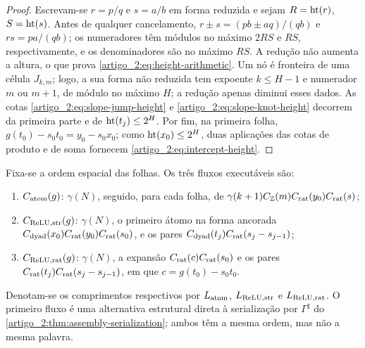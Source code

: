 \begin{proof}
Escrevam-se $r=p/q$ e $s=a/b$ em forma reduzida e sejam
$R=\operatorname{ht}(r)$, $S=\operatorname{ht}(s)$. Antes de qualquer cancelamento,
$r\pm s=(pb\pm aq)/(qb)$ e $rs=pa/(qb)$; os numeradores têm módulos no
máximo $2RS$ e $RS$, respectivamente, e os denominadores são no máximo
$RS$. A redução não aumenta a altura, o que prova
\eqref{artigo_2:eq:height-arithmetic}. Um nó é fronteira de uma célula
$J_{k,m}$; logo, a sua forma não reduzida tem expoente $k\le H-1$ e numerador
$m$ ou $m+1$, de módulo no máximo $H$; a redução apenas diminui esses dados. As
cotas \eqref{artigo_2:eq:slope-jump-height} e \eqref{artigo_2:eq:slope-knot-height} decorrem da
primeira parte e de $\operatorname{ht}(t_j)\le2^H$. Por fim, na primeira folha,
$g(t_0)-s_0t_0=y_0-s_0x_0$; como
$\operatorname{ht}(x_0)\le2^H$, duas aplicações das cotas de produto e de soma fornecem
\eqref{artigo_2:eq:intercept-height}.
\end{proof}

Fixa-se a ordem espacial das folhas. Os três fluxos executáveis são:
\begin{enumerate}[label=(\roman*),leftmargin=2.1em]
 \item $C_{\rm atom}(g)$: $\gamma(N)$, seguido, para cada folha, de
 $\gamma(k+1)C_{\mathbb Z}(m)C_{\rm rat}(y_0)C_{\rm rat}(s)$;
 \item $C_{\rm ReLU,str}(g)$: $\gamma(N)$, o primeiro átomo na forma ancorada
 $C_{\rm dyad}(x_0)C_{\rm rat}(y_0)C_{\rm rat}(s_0)$, e os pares
 $C_{\rm dyad}(t_j)C_{\rm rat}(s_j-s_{j-1})$;
 \item $C_{\rm ReLU,rat}(g)$: $\gamma(N)$, a expansão
 $C_{\rm rat}(c)C_{\rm rat}(s_0)$ e os pares
 $C_{\rm rat}(t_j)C_{\rm rat}(s_j-s_{j-1})$, em que
 $c=g(t_0)-s_0t_0$.
\end{enumerate}
Denotam-se os comprimentos respectivos por $L_{\rm atom}$,
$L_{\rm ReLU,str}$ e $L_{\rm ReLU,rat}$. O primeiro fluxo é uma alternativa
estrutural direta à serialização por $\Gamma^\sharp$ do
\cref{artigo_2:thm:assembly-serialization}; ambos têm a mesma ordem, mas não a mesma
palavra.


